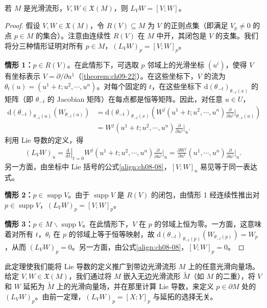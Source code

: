 \documentclass[../../main.tex]{subfiles}
\begin{document}
\begin{theorem}\label{theorem:ch09-38}
若 $M$ 是光滑流形，$V,W\in\mathfrak{X}(M)$，则 $L_VW=[V;W]$。
\end{theorem}

\begin{proof}
假设 $V,W\in\mathfrak{X}(M)$，令 $R(V)\subseteq M$ 为 $V$ 的正则点集（即满足 $V_p\neq 0$ 的点 $p\in M$ 的集合）。注意由连续性 $R(V)$ 在 $M$ 中开，其闭包是 $V$ 的支集。我们将分三种情形证明对所有 $p\in M$，$(L_VW)_p=[V;W]_p$。

\noindent\textbf{情形 1：}$p\in R(V)$。在此情形下，可选取 $p$ 邻域上的光滑坐标 $(u^i)$，使得 $V$ 有坐标表示 $V=\partial/\partial u^1$（\cref{theorem:ch09-22}）。在这些坐标下，$V$ 的流为 $\theta_t(u)=(u^1+t;u^2,\cdots ,u^n)$。对每个固定的 $t$，在这些坐标下 $\mathrm{d}(\theta_{-t})_{\theta_{-t}(x)}$ 的矩阵（即 $\theta_{-t}$ 的 Jacobian 矩阵）在每点都是恒等矩阵。因此，对任意 $u\in U$，
\begin{align*}
\mathrm{d}(\theta_{-t})_{\theta_{-t}(u)}(W_{\theta_{-t}(u)})
&=\mathrm{d}(\theta_{-t})_{\theta_{-t}(x)}\left(W^j(u^1+t;u^2,\cdots ,u^n)\frac{\partial}{\partial u^j}\bigg|_{\theta_{-t}(u)}\right)\\
&=W^j(u^1+t;u^2,\cdots ,u^n)\frac{\partial}{\partial u^j}\bigg|_u.
\end{align*}
利用 Lie 导数的定义，得
\begin{align*}
(L_VW)_u=\left.\frac{\mathrm{d}}{\mathrm{d}t}\right|_{t=0}W^j(u^1+t;u^2,\cdots ,u^n)\frac{\partial}{\partial u^j}\bigg|_u
=\frac{\partial W^j}{\partial u^1}(u^1,\cdots ,u^n)\frac{\partial}{\partial u^j}\bigg|_u.
\end{align*}
另一方面，由坐标中 Lie 括号的公式\eqref{align:ch08-08}，$[V;W]_u$ 易见等于同一表达式。

\noindent\textbf{情形 2：}$p\in\operatorname{supp}V$。由于 $\operatorname{supp}V$ 是 $R(V)$ 的闭包，由情形 1 经连续性推出对 $p\in\operatorname{supp}V$，$(L_VW)_p=[V;W]_p$。

\noindent\textbf{情形 3：}$p\in M\smallsetminus\operatorname{supp}V$。在此情形下，$V$ 在 $p$ 的邻域上恒为零。一方面，这意味着对所有 $t$，$\theta_t$ 在 $p$ 的邻域上等于恒等映射，故 $\mathrm{d}(\theta_{-t})_{\theta_{-t}(p)}(W_{\theta_{-t}(p)})=W_p$，从而 $(L_VW)_p=0$。另一方面，由公式\eqref{align:ch08-08}，$[V;W]_p=0$。
\end{proof}

此定理使我们能将 Lie 导数的定义推广到带边光滑流形 $M$ 上的任意光滑向量场。给定 $V,W\in\mathfrak{X}(M)$，我们通过将 $M$ 嵌入无边光滑流形 $\widetilde{M}$（如 $M$ 的二重），将 $V$ 和 $W$ 延拓为 $\widetilde{M}$ 上的光滑向量场，并在那里计算 Lie 导数，来定义 $p\in\partial M$ 处的 $(L_VW)_p$。由前一定理，$(L_VW)_p=[X;Y]_p$ 与延拓的选择无关。
\end{document}
